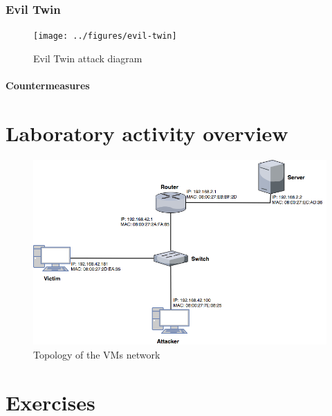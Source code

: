 \documentclass{article}
\begin{document}
\subsubsection{Evil Twin}
\begin{figure}[h]
  \center
  \texttt{[image: ../figures/evil-twin]}
  \caption{Evil Twin attack diagram}
\end{figure}
\paragraph{Countermeasures}
\section{Laboratory activity overview}
\begin{figure}[h]
  \center
  \includegraphics[width=.8\textwidth]{../figures/net_topo}
  \caption{Topology of the VMs network}
\end{figure}
\section{Exercises}
\end{document}
